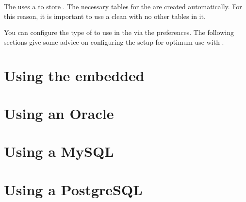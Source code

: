 The \ite{}  uses a \gddb{} to store \gdprojects{}. The necessary tables for the \gddb{} are created automatically. For this reason, it is important to use a clean \gddb{} with no other tables in it.

You can configure the type of \gddb{} to use in the \ite{} via the preferences. The following sections give some advice on configuring the \gddb{} setup for optimum use with \app{}.

\section{Using the embedded \gddb{}}


\section{Using an Oracle \gddb{}}


\section{Using a MySQL \gddb{}}


\section{Using a PostgreSQL \gddb{}}

